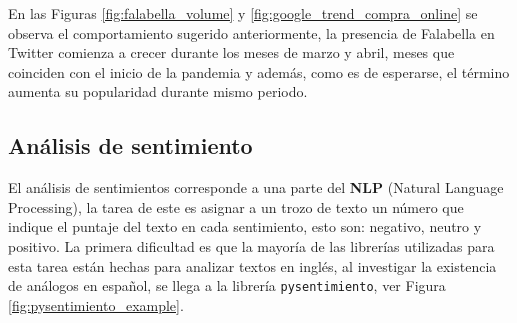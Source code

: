 \documentclass{article}
\begin{document}
En las Figuras \ref{fig:falabella_volume} y \ref{fig:google_trend_compra_online} se observa el comportamiento sugerido anteriormente, la presencia de Falabella en Twitter comienza a crecer durante los meses de marzo y abril, meses que coinciden con el inicio de la pandemia y además, como es de esperarse, el término  aumenta su popularidad durante mismo periodo.



\subsection{Análisis de sentimiento}
El análisis de sentimientos corresponde a una parte del \textbf{NLP} (Natural Language Processing), la tarea de este es asignar a un trozo de texto un número que indique el puntaje del texto en cada sentimiento, esto son: negativo, neutro y positivo. La primera dificultad es que la mayoría de las librerías utilizadas para esta tarea están hechas para analizar textos en inglés, al investigar la existencia de análogos en español, se llega a la librería \texttt{pysentimiento}, ver Figura \ref{fig:pysentimiento_example}.\\
\end{document}
